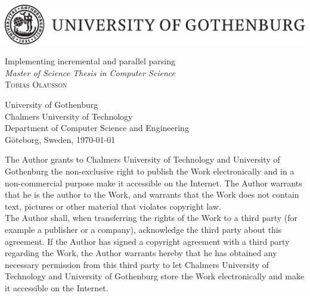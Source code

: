 \begin{titlepage}
\thispagestyle{empty}

\begin{center}
\includegraphics[width=\textwidth]{gulogo.pdf}
\end{center}


\vfill

\begin{flushleft}
{\LARGE Implementing incremental and parallel parsing} \\[0.2cm]
{\large \textit{Master of Science Thesis in Computer Science}}\\[3cm]

{\Huge \textsc{Tobias Olausson}}

\vfill

University of Gothenburg \\
Chalmers University of Technology \\
Department of Computer Science and Engineering \\
Göteborg, Sweden, \monthdate\today
\end{flushleft}

\newpage
\thispagestyle{empty}

\noindent The Author grants to Chalmers University of Technology and University
of Gothenburg  the non-exclusive right to publish the Work electronically and in
a non-commercial purpose make it accessible on the Internet.  The Author
warrants that he is the author to the Work, and warrants that the Work does
not contain text, pictures or other material that violates copyright law.\\

\noindent The Author shall, when transferring the rights of the Work to a third
party (for example a publisher or a company), acknowledge the third party about
this agreement. If the Author has signed a copyright agreement with a third
party regarding the Work, the Author warrants hereby that he has obtained
any necessary permission from this third party to let Chalmers University of
Technology and University of Gothenburg  store the Work electronically and make
it accessible on the Internet. \\[2cm]


\end{titlepage}
